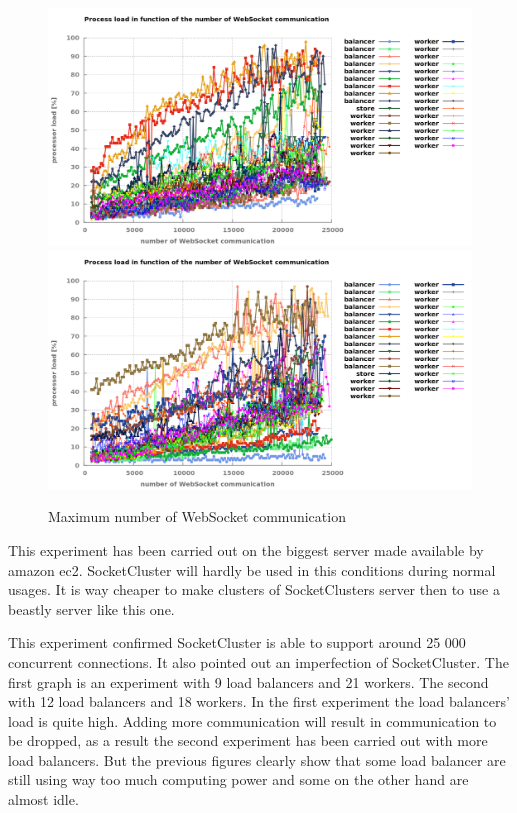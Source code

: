 \begin{figure}[H]
	\centering
		\includegraphics[width=\textwidth]{./Figures/9balancer.png}
		\includegraphics[width=\textwidth]{./Figures/12balancer.png}
	\caption[Maximum number of WebSocket communication]{Maximum number of WebSocket communication}
	\label{fig:max_communication}
\end{figure}

This experiment has been carried out on the biggest server made available by
amazon ec2.  SocketCluster will hardly be used in this conditions during normal
usages.  It is way cheaper to make clusters of SocketClusters server then to
use a beastly server like this one.

This experiment confirmed SocketCluster is able to support around 25 000
concurrent connections. It also pointed out an imperfection of SocketCluster.
The first graph is an experiment with 9 load balancers and 21 workers. The
second with 12 load balancers and 18 workers.  In the first experiment the load
balancers' load is quite high. Adding more communication will result in
communication to be dropped, as a result the second experiment has been carried
out with more load balancers. But the previous figures clearly show that some
load balancer are still using way too much computing power and some on the
other hand are almost idle.

